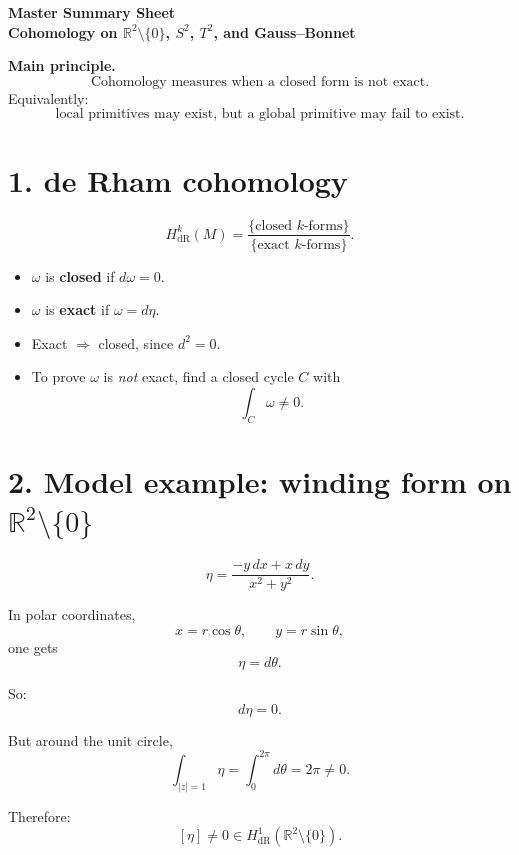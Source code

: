\documentclass[11pt]{article}
\begin{document}
	
	\begin{center}
		{\Large \textbf{Master Summary Sheet}}\\[4pt]
		{\large \textbf{Cohomology on \(\mathbb{R}^2\setminus\{0\}\), \(S^2\), \(T^2\), and Gauss--Bonnet}}
	\end{center}
	
	\vspace{0.5em}
	
	\begin{framed}
		\noindent\textbf{Main principle.}
		\[
		\boxed{\text{Cohomology measures when a closed form is not exact.}}
		\]
		Equivalently:
		\[
		\boxed{\text{local primitives may exist, but a global primitive may fail to exist.}}
		\]
	\end{framed}
	
	\section*{1. de Rham cohomology}
	
	\[
	H^k_{\mathrm{dR}}(M)
	=
	\frac{\{\text{closed }k\text{-forms}\}}{\{\text{exact }k\text{-forms}\}}.
	\]
	
	\begin{itemize}[leftmargin=2em,itemsep=0.2em]
		\item \(\omega\) is \textbf{closed} if \(d\omega=0\).
		\item \(\omega\) is \textbf{exact} if \(\omega=d\eta\).
		\item Exact \(\Rightarrow\) closed, since \(d^2=0\).
		\item To prove \(\omega\) is \emph{not} exact, find a closed cycle \(C\) with
		\[
		\int_C \omega \neq 0.
		\]
	\end{itemize}
	
	\section*{2. Model example: winding form on \(\mathbb{R}^2\setminus\{0\}\)}
	
	\[
	\eta=\frac{-y\,dx+x\,dy}{x^2+y^2}.
	\]
	
	In polar coordinates,
	\[
	x=r\cos\theta,\qquad y=r\sin\theta,
	\]
	one gets
	\[
	\eta=d\theta.
	\]
	
	So:
	\[
	d\eta=0.
	\]
	
	But around the unit circle,
	\[
	\int_{|z|=1}\eta=\int_0^{2\pi}d\theta=2\pi\neq 0.
	\]
	
	Therefore:
	\[
	[\eta]\neq 0 \in H^1_{\mathrm{dR}}(\mathbb{R}^2\setminus\{0\}).
	\]
	
\end{document}
